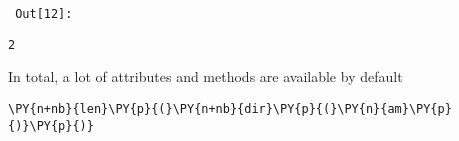         {\par%
        \vspace{-1\smallerfontscale}%
        \noindent%
        \begin{minipage}{\cellleftmargin}%
    \hfill%
    {\smaller%
    \tt%
    \color{nbframe-out-prompt}%
    Out[12]:}%
    \hspace{\inputpadding}%
    \hspace{0em}%
    \hspace{3pt}%
    \end{minipage}%
        }%
    \begin{addmargin}[\cellleftmargin]{0em}%
    {\smaller%
    \vspace{-1\smallerfontscale}%
    
    
    
    \begin{verbatim}
2
    \end{verbatim}

    
}%
    \end{addmargin}%
    In total, a lot of attributes and methods are available by default


{\par%
\vspace{-1\baselineskip}%
}%
\begin{notebookcell}[13]%
\begin{addmargin}[\cellleftmargin]{0em}%
{\smaller%
\par%
%
\vspace{-1\smallerfontscale}%
\begin{Verbatim}[commandchars=\\\{\}]
\PY{n+nb}{len}\PY{p}{(}\PY{n+nb}{dir}\PY{p}{(}\PY{n}{am}\PY{p}{)}\PY{p}{)}
\end{Verbatim}
%
\par%
\vspace{-1\smallerfontscale}}%
\end{addmargin}
\end{notebookcell}

\par\vspace{1\smallerfontscale}%
    
